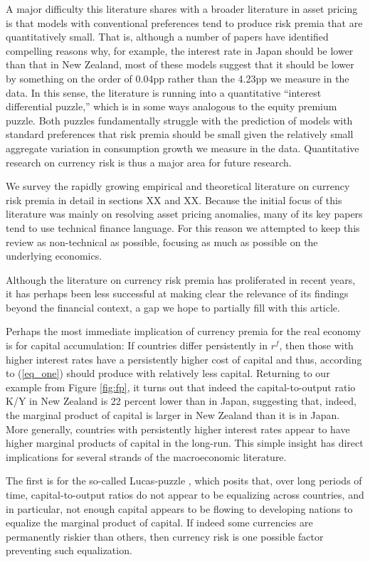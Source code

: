 \documentclass[12pt,letter]{article}
\theoremstyle{break} \theorembodyfont{\normalfont\itshape}
\theoremstyle{break}
\theoremstyle{break} \theorembodyfont{\normalfont\itshape}
\theoremstyle{break} \theorembodyfont{\normalfont\itshape}
\begin{document}
A major difficulty this literature shares with a broader literature in
asset pricing is that models with conventional preferences tend to
produce risk premia that are quantitatively small. That is, although a
number of papers have identified compelling reasons why, for example,
the interest rate in Japan should be lower than that in New Zealand,
most of these models suggest that it should be lower by something on
the order of 0.04pp rather than the 4.23pp we measure in the data. In
this sense, the literature is running into a quantitative ``interest
differential puzzle,'' which is in some ways analogous to the equity
premium puzzle. Both puzzles fundamentally struggle with the
prediction of models with standard preferences that risk premia should
be small given the relatively small aggregate variation in consumption
growth we measure in the data. Quantitative research on currency risk
is thus a major area for future research.

We survey the rapidly growing empirical and theoretical literature on
currency risk premia in detail in sections XX and XX. Because the
initial focus of this literature was mainly on resolving asset pricing
anomalies, many of its key papers tend to use technical finance
language. For this reason we attempted to keep this review as
non-technical as possible, focusing as much as possible on the
underlying economics.

Although the literature on currency risk premia has proliferated in
recent years, it has perhaps been less successful at making clear the
relevance of its findings beyond the financial context, a gap we hope
to partially fill with this article.

Perhaps the most immediate implication of currency premia for the real
economy is for capital accumulation: If countries differ persistently
in $r^f$, then those with higher interest rates have a persistently
higher cost of capital and thus, according to (\ref{eq_one}) should
produce with relatively less capital. Returning to our example from
Figure \ref{fig:fp}, it turns out that indeed the capital-to-output
ratio K/Y in New Zealand is 22 percent lower than in Japan, suggesting
that, indeed, the marginal product of capital is larger in New Zealand
than it is in Japan. More generally, countries with persistently
higher interest rates appear to have higher marginal products of
capital in the long-run. This simple insight has direct implications
for several strands of the macroeconomic literature.

The first is for the so-called Lucas-puzzle \citep{Lucas1990}, which
posits that, over long periods of time, capital-to-output ratios do
not appear to be equalizing across countries, and in particular, not
enough capital appears to be flowing to developing nations to equalize
the marginal product of capital. If indeed some currencies are
permanently riskier than others, then currency risk is one possible
factor preventing such equalization.
\end{document}
